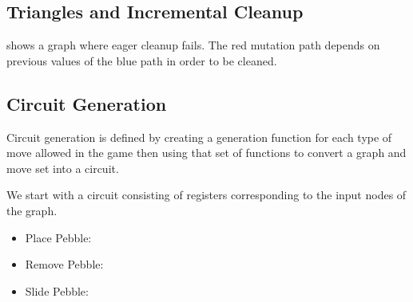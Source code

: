 \subsection{Triangles and Incremental Cleanup}
 shows a graph where eager cleanup fails. The red mutation
path depends on previous values of the blue path in order to be cleaned.

\subsection{Circuit Generation}
Circuit generation is defined by creating a generation function for each
type of move allowed in the game then using that set of functions to convert a
graph and move set into a circuit.

We start with a circuit consisting of registers corresponding to the input nodes
of the graph.

\begin{itemize}
    \item Place Pebble:
    \item Remove Pebble:
    \item Slide Pebble:
\end{itemize}

